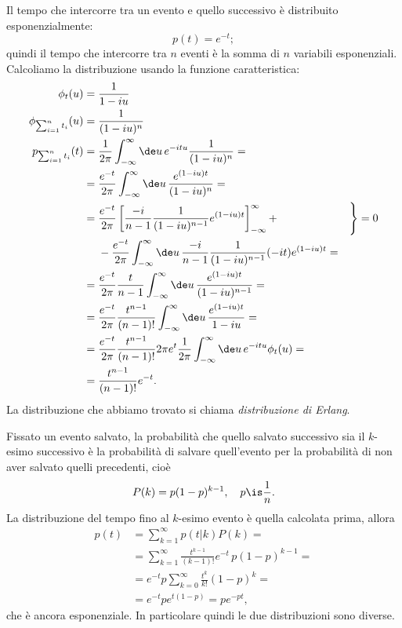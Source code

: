 \begin{solution}
	Il tempo che intercorre tra un evento e quello successivo è distribuito esponenzialmente:
	\begin{equation*}
		p(t) = e^{-t};
	\end{equation*}
	quindi il tempo che intercorre tra $n$ eventi è la somma di $n$ variabili esponenziali.
	Calcoliamo la distribuzione usando la funzione caratteristica:
	\begin{align*}
		\phi_t(u) &= \frac1{1-iu} \\
		\phi_{\sum_{i=1}^n t_i}(u) &= \frac1{(1-iu)^n} \\
		p_{\sum_{i=1}^n t_i}(t)
		&= \frac1{2\pi} \int_{-\infty}^\infty \de u\, e^{-itu} \frac1{(1-iu)^n} = \\
		&= \frac{e^{-t}}{2\pi} \int_{-\infty}^\infty \de u\, \frac{e^{(1-iu)t}}{(1-iu)^n} = \\
		&= \frac{e^{-t}}{2\pi}
		\left[ \frac{-i}{n-1} \frac1{(1-iu)^{n-1}} e^{(1-iu)t} \right]_{-\infty}^\infty + & \Bigg\} =0\\
		&\phantom{{}={}} - \frac{e^{-t}}{2\pi}
		\int_{-\infty}^\infty \de u\, \frac{-i}{n-1} \frac1{(1-iu)^{n-1}} (-it) e^{(1-iu)t} = \\
		&= \frac{e^{-t}}{2\pi} \frac{t}{n-1} \int_{-\infty}^\infty \de u\, \frac{e^{(1-iu)t}}{(1-iu)^{n-1}} = \\
		&= \frac{e^{-t}}{2\pi} \frac{t^{n-1}}{(n-1)!} \int_{-\infty}^\infty \de u\, \frac{e^{(1-iu)t}}{1-iu} = \\
		&= \frac{e^{-t}}{2\pi} \frac{t^{n-1}}{(n-1)!} 2\pi e^t \frac1{2\pi} \int_{-\infty}^\infty \de u\, e^{-itu} \phi_t(u) = \\
		&= \frac{t^{n-1}}{(n-1)!} e^{-t}.
	\end{align*}
	La distribuzione che abbiamo trovato si chiama \emph{distribuzione di Erlang}.
	
	Fissato un evento salvato, la probabilità che quello salvato successivo sia il $k$-esimo successivo è la probabilità di salvare quell'evento per la probabilità di non aver salvato quelli precedenti, cioè
	\begin{equation*}
		P(k) = p(1-p)^{k-1}, \quad p\is\frac1n.
	\end{equation*}
	La distribuzione del tempo fino al $k$-esimo evento è quella calcolata prima, allora
	\begin{align*}
		p(t) &= \sum_{k=1}^\infty p(t|k) P(k) = \\
		&= \sum_{k=1}^\infty \frac{t^{k-1}}{(k-1)!}e^{-t} \,  p(1-p)^{k-1} = \\
		&= e^{-t}p \sum_{k=0}^\infty \frac{t^k}{k!}(1-p)^k = \\
		&= e^{-t}p e^{t(1-p)} = pe^{-pt},
	\end{align*}
	che è ancora esponenziale.
	In particolare quindi le due distribuzioni sono diverse.
\end{solution}

